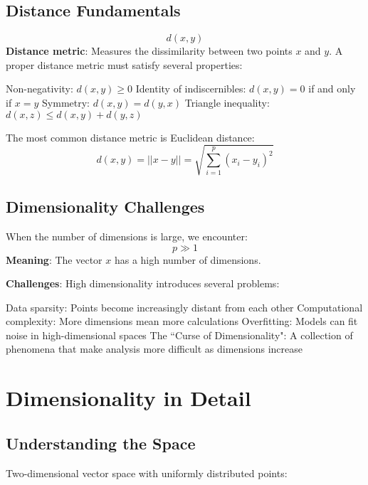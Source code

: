 \subsection{Distance Fundamentals}
\[
    d(x,y)
\]
\textbf{Distance metric}: Measures the dissimilarity between two points $x$ and $y$. A proper distance metric must satisfy several properties:
\begin{outline}
    \1 Non-negativity: $d(x,y) \geq 0$
    \1 Identity of indiscernibles: $d(x,y) = 0$ if and only if $x = y$
    \1 Symmetry: $d(x,y) = d(y,x)$
    \1 Triangle inequality: $d(x,z) \leq d(x,y) + d(y,z)$
\end{outline}

The most common distance metric is Euclidean distance:
\[
    d(x,y) = ||x-y|| = \sqrt{\sum_{i=1}^{p} (x_i - y_i)^2}
\]

\subsection{Dimensionality Challenges}
When the number of dimensions is large, we encounter:
\[
    p \gg 1
\]
\textbf{Meaning}: The vector $x$ has a high number of dimensions.

\textbf{Challenges}: High dimensionality introduces several problems:
\begin{outline}
    \1 Data sparsity: Points become increasingly distant from each other
    \1 Computational complexity: More dimensions mean more calculations
    \1 Overfitting: Models can fit noise in high-dimensional spaces
    \1 The ``Curse of Dimensionality": A collection of phenomena that make analysis more difficult as dimensions increase
\end{outline}

\section{Dimensionality in Detail}
\subsection{Understanding the Space}

Two-dimensional vector space with uniformly distributed points:

\begin{center}
\end{center}

